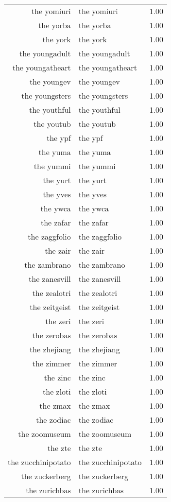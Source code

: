\begin{table}[ht]
\begin{tabular}{rlr}
  the yomiuri & the yomiuri & 1.00 \\ 
  the yorba & the yorba & 1.00 \\ 
  the york & the york & 1.00 \\ 
  the youngadult & the youngadult & 1.00 \\ 
  the youngatheart & the youngatheart & 1.00 \\ 
  the youngev & the youngev & 1.00 \\ 
  the youngsters & the youngsters & 1.00 \\ 
  the youthful & the youthful & 1.00 \\ 
  the youtub & the youtub & 1.00 \\ 
  the ypf & the ypf & 1.00 \\ 
  the yuma & the yuma & 1.00 \\ 
  the yummi & the yummi & 1.00 \\ 
  the yurt & the yurt & 1.00 \\ 
  the yves & the yves & 1.00 \\ 
  the ywca & the ywca & 1.00 \\ 
  the zafar & the zafar & 1.00 \\ 
  the zaggfolio & the zaggfolio & 1.00 \\ 
  the zair & the zair & 1.00 \\ 
  the zambrano & the zambrano & 1.00 \\ 
  the zanesvill & the zanesvill & 1.00 \\ 
  the zealotri & the zealotri & 1.00 \\ 
  the zeitgeist & the zeitgeist & 1.00 \\ 
  the zeri & the zeri & 1.00 \\ 
  the zerobas & the zerobas & 1.00 \\ 
  the zhejiang & the zhejiang & 1.00 \\ 
  the zimmer & the zimmer & 1.00 \\ 
  the zinc & the zinc & 1.00 \\ 
  the zloti & the zloti & 1.00 \\ 
  the zmax & the zmax & 1.00 \\ 
  the zodiac & the zodiac & 1.00 \\ 
  the zoomuseum & the zoomuseum & 1.00 \\ 
  the zte & the zte & 1.00 \\ 
  the zucchinipotato & the zucchinipotato & 1.00 \\ 
  the zuckerberg & the zuckerberg & 1.00 \\ 
  the zurichbas & the zurichbas & 1.00 \\ 
   \hline
\end{tabular}
\end{table}
